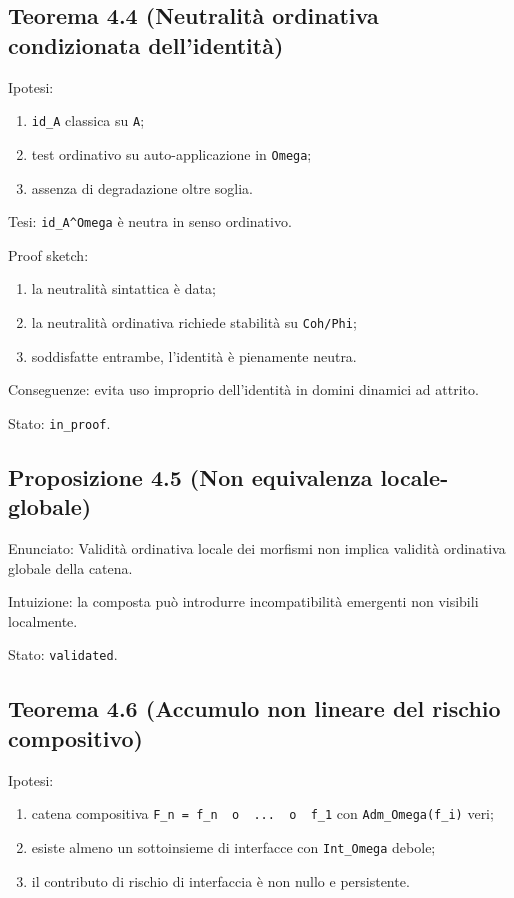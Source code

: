 \subsection{Teorema 4.4 (Neutralità ordinativa condizionata dell'identità)}

Ipotesi:

\begin{enumerate}
\def\labelenumi{\arabic{enumi}.}
\tightlist
\item
  \texttt{id\_A} classica su \texttt{A};
\item
  test ordinativo su auto-applicazione in \texttt{Omega};
\item
  assenza di degradazione oltre soglia.
\end{enumerate}

Tesi:
\texttt{id\_A\^{}Omega} è neutra in senso ordinativo.

Proof sketch:

\begin{enumerate}
\def\labelenumi{\arabic{enumi}.}
\tightlist
\item
  la neutralità sintattica è data;
\item
  la neutralità ordinativa richiede stabilità su \texttt{Coh/Phi};
\item
  soddisfatte entrambe, l'identità è pienamente neutra.
\end{enumerate}

Conseguenze:
evita uso improprio dell'identità in domini dinamici ad attrito.

Stato: \texttt{in\_proof}.

\subsection{Proposizione 4.5 (Non equivalenza locale-globale)}

Enunciato:
Validità ordinativa locale dei morfismi non implica validità ordinativa globale della catena.

Intuizione:
la composta può introdurre incompatibilità emergenti non visibili localmente.

Stato: \texttt{validated}.

\subsection{Teorema 4.6 (Accumulo non lineare del rischio compositivo)}

Ipotesi:

\begin{enumerate}
\def\labelenumi{\arabic{enumi}.}
\tightlist
\item
  catena compositiva \texttt{F\_n\ =\ f\_n\ \ o\ \ ...\ \ o\ \ f\_1} con \texttt{Adm\_Omega(f\_i)} veri;
\item
  esiste almeno un sottoinsieme di interfacce con \texttt{Int\_Omega} debole;
\item
  il contributo di rischio di interfaccia è non nullo e persistente.
\end{enumerate}

